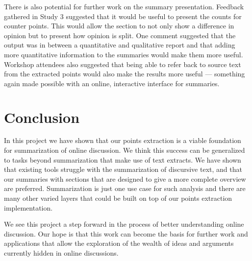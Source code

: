     There is also potential for further work on the summary presentation. Feedback gathered in Study 3 suggested that it would be useful to present the counts for counter points. This would allow the section to not only show a difference in opinion but to present how opinion is split. One comment suggested that the output was in between a quantitative and qualitative report and that adding more quantitative information to the summaries would make them more useful. Workshop attendees also suggested that being able to refer back to source text from the extracted points would also make the results more useful --- something again made possible with an online, interactive interface for summaries.

  \section{Conclusion}
    In this project we have shown that our points extraction is a viable foundation for summarization of online discussion. We think this success can be generalized to tasks beyond summarization that make use of text extracts. We have shown that existing tools struggle with the summarization of discursive text, and that our summaries with sections that are designed to give a more complete overview are preferred. Summarization is just one use case for such analysis and there are many other varied layers that could be built on top of our points extraction implementation.

    We see this project a step forward in the process of better understanding online discussion. Our hope is that this work can become the basis for further work and applications that allow the exploration of the wealth of ideas and arguments currently hidden in online discussions.
